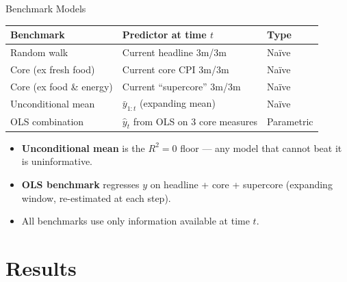 \documentclass[aspectratio=169, 11pt]{beamer}
\begin{document}
\begin{frame}{Benchmark Models}
  \begin{table}[h]
    \centering
    \small
    \begin{tabular}{lll}
      \toprule
      \textbf{Benchmark} & \textbf{Predictor at time $t$} & \textbf{Type} \\
      \midrule
      Random walk & Current headline 3m/3m & Na\"ive \\
      Core (ex fresh food) & Current core CPI 3m/3m & Na\"ive \\
      Core (ex food \& energy) & Current ``supercore'' 3m/3m & Na\"ive \\
      Unconditional mean & $\bar{y}_{1:t}$ (expanding mean) & Na\"ive \\
      OLS combination & $\hat{y}_t$ from OLS on 3 core measures & Parametric \\
      \bottomrule
    \end{tabular}
  \end{table}
  \vspace{6pt}
  \begin{itemize}
    \item \textbf{Unconditional mean} is the $R^2 = 0$ floor --- any model that
          cannot beat it is uninformative.
    \item \textbf{OLS benchmark} regresses $y$ on headline + core + supercore
          (expanding window, re-estimated at each step).
    \item All benchmarks use only information available at time $t$.
  \end{itemize}
\end{frame}

\section{Results}
\end{document}
